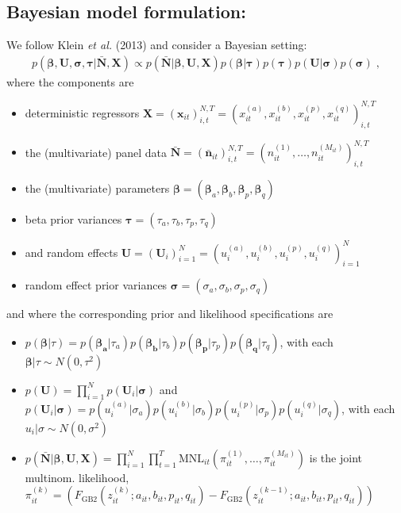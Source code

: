 \documentclass[a4paper,12pt]{scrartcl} %
\newcommand{\bs}{\boldsymbol}  %
\begin{document}
\subsection*{Bayesian model formulation:}
We follow Klein \textit{et al.} (2013) and consider a Bayesian setting:
\begin{align*}
p\left(\boldsymbol{\beta},\boldsymbol{U},\boldsymbol{\sigma},\boldsymbol{\tau}|\bar{\boldsymbol{N}},\boldsymbol{X}\right)
\propto p\left(\bar{\boldsymbol{N}}|\boldsymbol{\beta},\boldsymbol{U},\boldsymbol{X}\right)p\left(\boldsymbol{\beta}|\boldsymbol{\tau}\right)p\left(\boldsymbol{\tau}\right)
p\left(\boldsymbol{U}|\boldsymbol{\sigma}\right)p(\boldsymbol{\sigma})\;,
\end{align*}
where the components are
\begin{itemize}
\item deterministic regressors 
$
\boldsymbol{X}=
\left(\boldsymbol{x}_{it}\right)_{i,t}^{N,T}=
\left(
x_{it}^{(a)},x_{it}^{(b)},x_{it}^{(p)},x_{it}^{(q)}
\right)_{i,t}^{N,T}
$ 
\item the (multivariate) panel data  
$
\bar{\boldsymbol{N}}=
\left(\boldsymbol{\bar{n}}_{it}\right)_{i,t}^{N,T}=
\left(n_{it}^{(1)},\ldots,n_{it}^{(M_{it})}\right)_{i,t}^{N,T}$ 
\item the (multivariate) parameters 
$\boldsymbol{\beta}=
\left(
\boldsymbol{\beta}_{a},\boldsymbol{\beta}_{b},
\boldsymbol{\beta}_{p},\boldsymbol{\beta}_{q}
\right)
$
\item beta prior variances
$\boldsymbol{\tau}=
\left(
\tau_{a},\tau_{b},\tau_{p},\tau_{q}
\right)
$
\item and random effects $\boldsymbol{U}=\left(\boldsymbol{U}_i\right)_{i=1}^N=\left(u_i^{(a)},u_i^{(b)},u_i^{(p)},u_i^{(q)}\right)_{i=1}^N$
\item random effect prior variances
$\boldsymbol{\sigma}=
\left(
\sigma_{a},\sigma_{b},\sigma_{p},\sigma_{q}
\right)
$
\end{itemize}
and where the corresponding prior and likelihood specifications are
\begin{itemize}
\item $p\left(\boldsymbol{\beta}|\tau\right)=
p\left(\boldsymbol{\beta_a}|\tau_{a}\right)
p\left(\boldsymbol{\beta_b}|\tau_{b}\right)
p\left(\boldsymbol{\beta_p}|\tau_{p}\right)
p\left(\boldsymbol{\beta_q}|\tau_{q}\right)$,
with each $\boldsymbol{\beta}|\tau\sim N(0,\tau^2)$
\item $p\left(\bs{U}\right)=\prod_{i=1}^N p(\boldsymbol{U}_i|\boldsymbol{\sigma})$ and $p(\boldsymbol{U}_i|\boldsymbol{\sigma})=
p\left(u_i^{(a)}|\sigma_{a}\right)
p\left(u_i^{(b)}|\sigma_{b}\right)
p\left(u_i^{(p)}|\sigma_{p}\right)
p\left(u_i^{(q)}|\sigma_{q}\right)
$,
with each $u_i|\sigma\sim N(0,\sigma^2)$ 
\item 
$
p
\left(
\bar{\boldsymbol{N}}|
\boldsymbol{\beta},\boldsymbol{U},
\boldsymbol{X}
\right)=
\prod_{i=1}^N \prod_{t=1}^T \text{MNL}_{it}\left(\pi_{it}^{(1)},\ldots,\pi_{it}^{(M_{it})}\right)$ 
is the joint multinom. likelihood, $\pi_{it}^{(k)}=\left(F_{\text{GB2}}
(z_{it}^{(k)};a_{it},b_{it},p_{it},q_{it})-F_{\text{GB2}}(z_{it}^{(k-1)};a_{it},b_{it},p_{it},q_{it})\right)$
\end{itemize}
\clearpage
\end{document}
